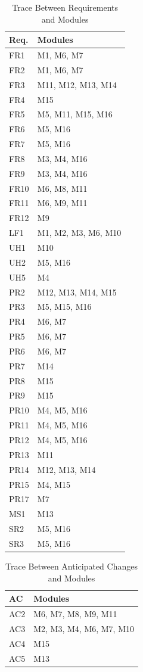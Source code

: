 \documentclass[12pt, titlepage]{article}
\begin{document}
\begin{table}[H]
\centering
\begin{tabular}{p{} p{}}
\toprule
\textbf{Req.} & \textbf{Modules}\\
\midrule
FR1 & M1, M6, M7\\
FR2 & M1, M6, M7\\
FR3 & M11, M12, M13, M14\\
FR4 & M15\\
FR5 & M5, M11, M15, M16\\
FR6 & M5, M16\\
FR7 & M5, M16\\
FR8 & M3, M4, M16 \\
FR9 & M3, M4, M16 \\
FR10 & M6, M8, M11\\
FR11 & M6, M9, M11 \\
FR12 & M9\\
LF1 & M1, M2, M3, M6, M10\\
UH1 & M10\\
UH2 & M5, M16\\
UH5 & M4\\
PR2 & M12, M13, M14, M15\\
PR3 & M5, M15, M16\\
PR4 & M6, M7\\
PR5 & M6, M7\\
PR6 & M6, M7\\
PR7 & M14\\
PR8 & M15\\
PR9 & M15\\
PR10 & M4, M5, M16\\
PR11 & M4, M5, M16\\
PR12 & M4, M5, M16\\
PR13 & M11\\
PR14 & M12, M13, M14\\
PR15 & M4, M15\\
PR17 & M7\\
MS1 & M13\\
SR2 & M5, M16\\
SR3 & M5, M16\\


\bottomrule
\end{tabular}
\caption{Trace Between Requirements and Modules}
\label{TblRT}
\end{table}

\begin{table}[H]
\centering
\begin{tabular}{p{} p{}}
\toprule
\textbf{AC} & \textbf{Modules}\\
\midrule
AC2 & M6, M7, M8, M9, M11\\
AC3 & M2, M3, M4, M6, M7, M10\\
AC4 & M15\\
AC5 & M13\\
\bottomrule
\end{tabular}
\caption{Trace Between Anticipated Changes and Modules}
\label{TblACT}
\end{table}
\end{document}
